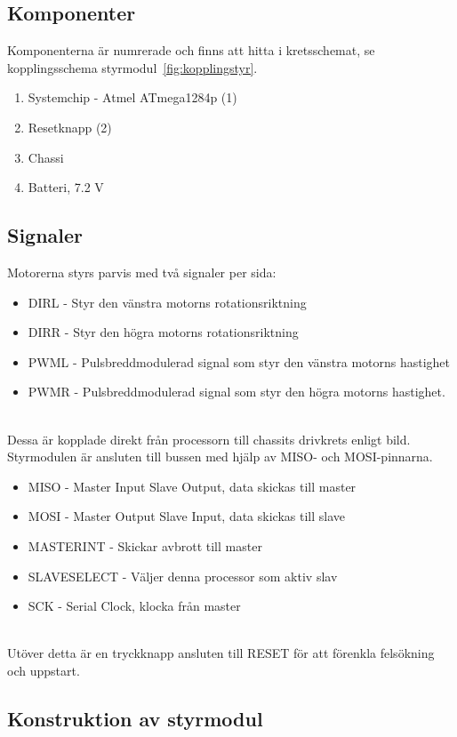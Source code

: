 \documentclass[a4paper,12pt,fleqn]{article}
\begin{document}

\subsection{Komponenter}
Komponenterna är numrerade och finns att hitta i kretsschemat, se kopplingsschema styrmodul~\ref{fig:kopplingstyr}.
\begin{enumerate}
	\item Systemchip - Atmel ATmega1284p (1)
	\item Resetknapp (2)
	\item Chassi
	\item Batteri, 7.2 V
\end{enumerate}
\subsection{Signaler}
Motorerna styrs parvis med två signaler per sida:
\begin{itemize}
	\item DIRL - Styr den vänstra motorns rotationsriktning
	\item DIRR - Styr den högra motorns rotationsriktning
	\item PWML - Pulsbreddmodulerad signal som styr den vänstra motorns hastighet
	\item PWMR - Pulsbreddmodulerad signal som styr den högra motorns hastighet.
\end{itemize}
~\\
Dessa är kopplade direkt från processorn till chassits drivkrets enligt bild.
Styrmodulen är ansluten till bussen med hjälp av MISO- och MOSI-pinnarna.

\begin{itemize}
	\item MISO - Master Input Slave Output, data skickas till master
	\item MOSI - Master Output Slave Input, data skickas till slave
	\item MASTERINT - Skickar avbrott till master
	\item SLAVESELECT - Väljer denna processor som aktiv slav
	\item SCK - Serial Clock, klocka från master
\end{itemize}
~\\
Utöver detta är en tryckknapp ansluten till RESET för att förenkla felsökning och uppstart. 

\subsection{Konstruktion av styrmodul}
\end{document}
